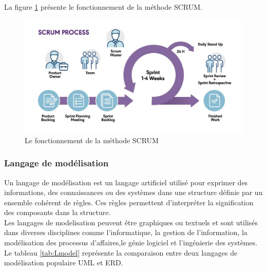 \documentclass[12pt]{report}
\begin{document}
				La figure \ref{fig:SCRUM} présente le fonctionnement de la méthode SCRUM.

				\begin{figure}[h]
					\centering
					\includegraphics[width=\textwidth]{scrum.jpg}
					\caption{Le fonctionnement de la méthode SCRUM \cite{pm-partners}}
					\label{fig:SCRUM}
				\end{figure}
				\FloatBarrier				


				\subsubsection{Langage de modélisation}

				\hspace{15pt} Un langage de modélisation est un langage artificiel utilisé pour exprimer des informations, des connaissances ou des systèmes dans une structure définie par un ensemble cohérent de règles. Ces règles permettent d'interpréter la signification des composants dans la structure. \\

				Les langages de modelisation peuvent être graphiques ou textuels et sont utilisés dans diverses disciplines comme l'informatique, la gestion de l'information, la modélisation des processus d'affaires,le génie logiciel et l'ingénierie des systèmes.\\


				Le tableau \ref{tab:Lmodel} représente la comparaison entre deux langages de modélisation populaire UML et ERD.
\end{document}
